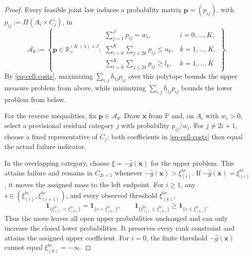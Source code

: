 \documentclass[review,11pt,3p,authoryear,nopreprintline]{elsarticle}
\begin{document}
\begin{proof}
  Every feasible joint law induces a probability matrix $\bm p=(p_{ij})$, with $p_{ij}:=\Pi(A_i\times C_j)$, in
  \begin{equation}
    \mathcal A_\theta:=
    \left\{\bm p\in\mathbb R_+^{(K+1)\times J}:
    \begin{array}{ll}
      \displaystyle\sum_{j=1}^Jp_{ij}=w_i,
        &i=0,\ldots,K,\\[1mm]
      \displaystyle\sum_{i=0}^K\sum_{j<2k}p_{ij}\le u_k,
        &k=1,\ldots,K,\\[1mm]
      \displaystyle\sum_{i=0}^K\sum_{j\le2k}p_{ij}\ge l_k,
        &k=1,\ldots,K
    \end{array}\right\}.
    \label{eq-cell-mass-polytope}
  \end{equation}
  By \eqref{eq-cell-costs}, maximizing $\sum_{i,j}\overline h_{ij}p_{ij}$ over this polytope bounds the upper measure problem from above, while minimizing $\sum_{i,j}\underline h_{ij}p_{ij}$ bounds the lower problem from below.

  For the reverse inequalities, fix $\bm p\in\mathcal A_\theta$. Draw $\bm x$ from $\mathbb P$ and, on $A_i$ with $w_i>0$, select a provisional residual category $j$ with probability $p_{ij}/w_i$. For $j\ne2i+1$, choose a fixed representative of $C_j$; both coefficients in \eqref{eq-cell-costs} then equal the actual failure indicator.

  In the overlapping category, choose $\xi=-\hat g(\bm x)$ for the upper problem. This attains failure and remains in $C_{2i+1}$ whenever $-\hat g(\bm x)>\xi_{(i)}^{\mathrm{te}}$. If $-\hat g(\bm x)=\xi_{(i)}^{\mathrm{te}}$, it moves the assigned mass to the left endpoint. For $i\ge1$, any $s\in(\xi_{(i)}^{\mathrm{te}},\xi_{(i+1)}^{\mathrm{te}})$, and every observed threshold $\xi_{(k)}^{\mathrm{te}}$,
  \begin{equation}
    \mathbf1_{\{\xi_{(i)}^{\mathrm{te}}<\xi_{(k)}^{\mathrm{te}}\}}=\mathbf1_{\{s<\xi_{(k)}^{\mathrm{te}}\}},\qquad
    \mathbf1_{\{\xi_{(i)}^{\mathrm{te}}\le \xi_{(k)}^{\mathrm{te}}\}}\ge\mathbf1_{\{s\le \xi_{(k)}^{\mathrm{te}}\}}.
    \label{eq-endpoint-move}
  \end{equation}
  Thus the move leaves all open upper probabilities unchanged and can only increase the closed lower probabilities. It preserves every rank constraint and attains the assigned upper coefficient. For $i=0$, the finite threshold $-\hat g(\bm x)$ cannot equal $\xi_{(0)}^{\mathrm{te}}=-\infty$.


\end{proof}
\end{document}

